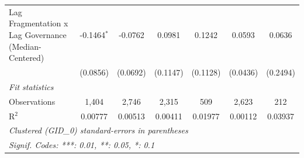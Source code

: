 \begin{table}[H]
\begin{tabular}{lcccccc}
      Lag Fragmentation x Lag Governance (Median-Centered) & -0.1464$^{*}$ & -0.0762       & 0.0981       & 0.1242        & 0.0593   & 0.0636\\   
                                                           & (0.0856)      & (0.0692)      & (0.1147)     & (0.1128)      & (0.0436) & (0.2494)\\   
      \midrule
      \emph{Fit statistics}\\
      Observations                                         & 1,404         & 2,746         & 2,315        & 509           & 2,623    & 212\\  
      R$^2$                                                & 0.00777       & 0.00513       & 0.00411      & 0.01977       & 0.00112  & 0.03937\\  
      \midrule \midrule
      \multicolumn{7}{l}{\emph{Clustered (GID\_0) standard-errors in parentheses}}\\
      \multicolumn{7}{l}{\emph{Signif. Codes: ***: 0.01, **: 0.05, *: 0.1}}\\
   \end{tabular}
\end{table}


